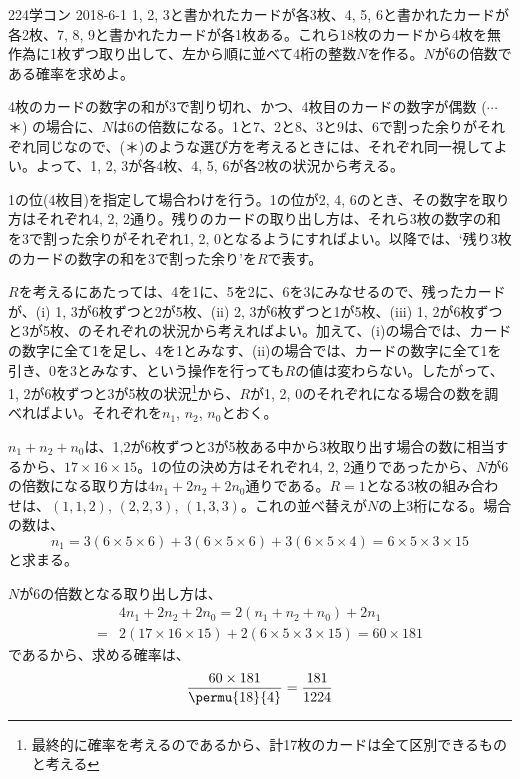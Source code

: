 \begin{prob}{224}{\maru}{学コン 2018-6-1}
 1, 2, 3と書かれたカードが各3枚、4, 5, 6と書かれたカードが各2枚、7, 8, 9と書かれたカードが各1枚ある。これら18枚のカードから4枚を無作為に1枚ずつ取り出して、左から順に並べて4桁の整数$N$を作る。$N$が6の倍数である確率を求めよ。
\end{prob}

4枚のカードの数字の和が3で割り切れ、かつ、4枚目のカードの数字が偶数 ($\cdots$ ＊) の場合に、$N$は6の倍数になる。1と7、2と8、3と9は、6で割った余りがそれぞれ同じなので、(＊)のような選び方を考えるときには、それぞれ同一視してよい。よって、1, 2, 3が各4枚、4, 5, 6が各2枚の状況から考える。

1の位(4枚目)を指定して場合わけを行う。1の位が2, 4, 6のとき、その数字を取り方はそれぞれ4, 2, 2通り。残りのカードの取り出し方は、それら3枚の数字の和を3で割った余りがそれぞれ1, 2, 0となるようにすればよい。以降では、`残り3枚のカードの数字の和を3で割った余り'を$R$で表す。

$R$を考えるにあたっては、4を1に、5を2に、6を3にみなせるので、残ったカードが、(i) 1, 3が6枚ずつと2が5枚、(ii) 2, 3が6枚ずつと1が5枚、(iii) 1, 2が6枚ずつと3が5枚、のそれぞれの状況から考えればよい。加えて、(i)の場合では、カードの数字に全て1を足し、4を1とみなす、(ii)の場合では、カードの数字に全て1を引き、0を3とみなす、という操作を行っても$R$の値は変わらない。したがって、1, 2が6枚ずつと3が5枚の状況\footnote{最終的に確率を考えるのであるから、計17枚のカードは全て区別できるものと考える}から、$R$が1, 2, 0のそれぞれになる場合の数を調べればよい。それぞれを$n_1$, $n_2$, $n_0$とおく。

$n_1+n_2+n_0$は、1,2が6枚ずつと3が5枚ある中から3枚取り出す場合の数に相当するから、$17\times 16\times 15$。1の位の決め方はそれぞれ4, 2, 2通りであったから、$N$が6の倍数になる取り方は$4n_1+2n_2+2n_0$通りである。$R=1$となる3枚の組み合わせは、$(1, 1, 2)$, $(2, 2, 3)$, $(1, 3, 3)$。これの並べ替えが$N$の上3桁になる。場合の数は、
\[ n_1=3(6\times 5\times 6)+3(6\times 5\times 6)+3(6\times 5\times 4)=6\times 5\times 3\times 15 \]
と求まる。

$N$が6の倍数となる取り出し方は、
\begin{align*}
 &4n_1+2n_2+2n_0=2(n_1+n_2+n_0)+2n_1 \\
 =&2(17\times 16\times 15) + 2(6\times 5\times 3\times 15) = 60\times 181
\end{align*}
であるから、求める確率は、
\[ \frac{60\times 181}{\permu{18}{4}}=\frac{181}{1224} \]